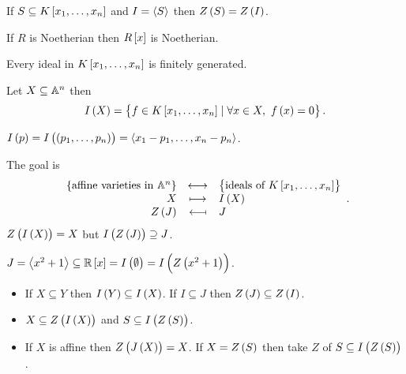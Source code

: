 \begin{remark}
If $ S \subseteq K\sbr{x_1, \dots, x_n} $ and $ I = \left\langle S \right\rangle $ then $ Z\br{S} = Z\br{I} $.
\end{remark}

\begin{theorem}
If $ R $ is Noetherian then $ R\sbr{x} $ is Noetherian.
\end{theorem}

\begin{corollary}
Every ideal in $ K\sbr{x_1, \dots, x_n} $ is finitely generated.
\end{corollary}

\begin{definition}
Let $ X \subseteq \mathbb{A}^n $ then
$$ I\br{X} = \cbr{f \in K\sbr{x_1, \dots, x_n} \mid \forall x \in X, \ f\br{x} = 0}. $$
\end{definition}

\begin{example}
$ I\br{p} = I\br{\br{p_1, \dots, p_n}} = \abr{x_1 - p_1, \dots, x_n - p_n} $.
\end{example}

The goal is
$$
\begin{array}{rcl}
\cbr{\text{affine varieties in} \ \A^n} & \longleftrightarrow & \cbr{\text{ideals of} \ K\sbr{x_1, \dots, x_n}} \\
X & \longmapsto & I\br{X} \\
Z\br{J} & \longmapsfrom & J
\end{array}.
$$
$ Z\br{I\br{X}} = X $ but $ I\br{Z\br{J}} \supseteq J $.

\begin{example}
$ J = \abr{x^2 + 1} \subseteq \R\sbr{x} = I\br{\emptyset} = I\br{Z\br{x^2 + 1}} $.
\end{example}

\begin{proposition}
\hfill
\begin{itemize}
\item If $ X \subseteq Y $ then $ I\br{Y} \subseteq I\br{X} $. If $ I \subseteq J $ then $ Z\br{J} \subseteq Z\br{I} $.
\item $ X \subseteq Z\br{I\br{X}} $ and $ S \subseteq I\br{Z\br{S}} $.
\item If $ X $ is affine then $ Z\br{J\br{X}} = X $. If $ X = Z\br{S} $ then take $ Z $ of $ S \subseteq I\br{Z\br{S}} $.
\end{itemize}
\end{proposition}

